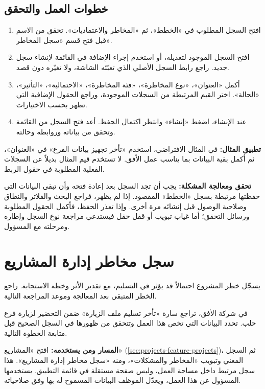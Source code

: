 \subsection{خطوات العمل والتحقق}
\begin{enumerate}
\item افتح السجل المطلوب في «الخطط»، ثم «المخاطر والاعتماديات». تحقق من الاسم قبل فتح قسم «سجل المخاطر».
\item افتح السجل الموجود لتعديله، أو استخدم إجراء الإضافة في القائمة لإنشاء سجل جديد. راجع رابط السجل الأصلي الذي تعبّئه الشاشة، ولا تغيّره دون قصد.
\item أكمل «العنوان»، «نوع المخاطرة»، «فئة المخاطرة»، «الاحتمالية»، «التأثير»، «الحالة». اختر القيم المرتبطة من السجلات الموجودة، وراجع الحقول الإضافية التي تظهر بحسب الاختيارات.
\item عند الإنشاء، اضغط «إنشاء» وانتظر اكتمال الحفظ. أعد فتح السجل من القائمة وتحقق من بياناته وروابطه وحالته.
\end{enumerate}

\textbf{تطبيق المثال:} في المثال الافتراضي، استخدم «تأخر تجهيز بيانات الفرع» في «العنوان»، ثم أكمل بقية البيانات بما يناسب عمل الأفق. لا تستخدم قيم المثال بديلاً عن السجلات الفعلية المطلوبة في حقول الربط.

\textbf{تحقق ومعالجة المشكلة:} يجب أن تجد السجل بعد إعادة فتحه وأن تبقى البيانات التي حفظتها مرتبطة بسجل «الخطط» المقصود. إذا لم يظهر، فراجع البحث والفلاتر والنطاق وصلاحية الوصول قبل إنشائه مرة أخرى. وإذا تعذر الحفظ، فأكمل الحقول المطلوبة ورسائل التحقق؛ أما غياب تبويب أو قفل حقل فيستدعي مراجعة نوع السجل وإطاره ومرحلته مع المسؤول.

\clearpage
\section{سجل مخاطر إدارة المشاريع}
\label{sec:projects-feature-project-risks}

يسجّل خطر المشروع احتمالاً قد يؤثر في التسليم، مع تقدير الأثر وخطة الاستجابة. راجع الخطر المتبقي بعد المعالجة وموعد المراجعة التالية.

\begin{rcnote}
في شركة الأفق، تراجع سارة «تأخر تسليم ملف الزيارة» ضمن التحضير لزيارة فرع حلب. تحدد البيانات التي تخص هذا العمل وتتحقق من ظهورها في السجل الصحيح قبل متابعة الخطوة التالية.
\end{rcnote}

\textbf{المسار ومن يستخدمه:} افتح «المشاريع» (\ref{sec:projects-feature-projects})، ثم السجل المعني وتبويب «المخاطر والمشكلات»، ومنه «سجل مخاطر إدارة المشاريع». هذا سجل مرتبط داخل مساحة العمل، وليس صفحة مستقلة في قائمة التطبيق. يستخدمها المسؤول عن هذا العمل، ويعدّل الموظف البيانات المسموح له بها وفق صلاحياته.

